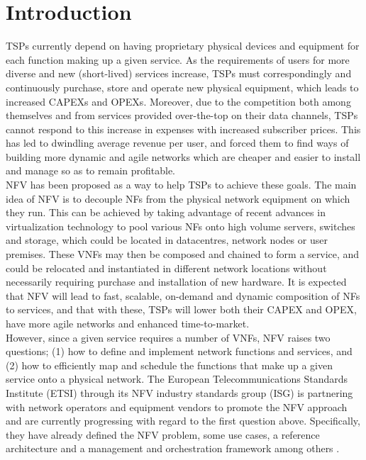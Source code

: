 \documentclass[conference]{IEEEtran}
\begin{document}
\section{Introduction}
\acp{TSP} currently depend on having proprietary physical devices and equipment for each function making up a given service. As the requirements of users for more diverse and new (short-lived) services increase, \acp{TSP} must correspondingly and continuously purchase, store and operate new physical equipment, which leads to increased \acp{CAPEX} and \acp{OPEX}. Moreover, due to the competition both among themselves and from services provided over-the-top on their data channels, \acp{TSP} cannot respond to this increase in expenses with increased subscriber prices. This has led to dwindling average revenue per user, and forced them to find ways of building more dynamic and agile networks which are cheaper and easier to install and manage so as to remain profitable.\\
\indent \ac{NFV} \cite{nfv, mano} has been proposed as a way to help \acp{TSP} to achieve these goals. The main idea of \ac{NFV} is to decouple \acp{NF} from the physical network equipment on which they run. This can be achieved by taking advantage of recent advances in virtualization technology to pool various \acp{NF} onto high volume servers, switches and storage, which could be located in datacentres, network nodes or user premises. These \acp{VNF} may then be composed and chained to form a service, and could be relocated and instantiated in different network locations without necessarily requiring purchase and installation of new hardware. It is expected that \ac{NFV} will lead to fast, scalable, on-demand and dynamic composition of \acp{NF} to services, and that with these, \acp{TSP} will lower both their CAPEX and OPEX, have more agile networks and enhanced time-to-market.\\
\indent However, since a given service requires a number of VNFs, \ac{NFV} raises two questions; (1) how to define and implement network functions and services, and (2) how to efficiently map and schedule the functions that make up a given service onto a physical network. The European Telecommunications Standards Institute (ETSI) through its NFV industry standards group (ISG) is partnering with network operators and equipment vendors to promote the NFV approach and are currently progressing with regard to the first question above. Specifically, they have already defined the NFV problem, some use cases, a reference architecture and a management and orchestration framework among others \cite{ETSIDOCS}.\\
\end{document}
